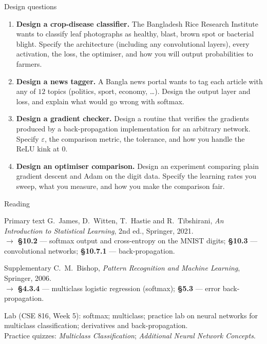 \documentclass[aspectratio=169,10pt]{beamer}
\begin{document}
\begin{frame}{Design questions}
  \footnotesize
  \begin{enumerate}
    \item \textbf{Design a crop-disease classifier.} The Bangladesh Rice Research Institute
          wants to classify leaf photographs as healthy, blast, brown spot or bacterial
          blight. Specify the architecture (including any convolutional layers), every
          activation, the loss, the optimiser, and how you will output probabilities to
          farmers. \hfill{}
    \item \textbf{Design a news tagger.} A Bangla news portal wants to tag each article with
          any of $12$ topics (politics, sport, economy, \dots). Design the output layer and
          loss, and explain what would go wrong with softmax. \hfill{}
    \item \textbf{Design a gradient checker.} Design a routine that verifies the gradients
          produced by a back-propagation implementation for an arbitrary network. Specify
          $\varepsilon$, the comparison metric, the tolerance, and how you handle the
          ReLU kink at $0$. \hfill{}
    \item \textbf{Design an optimiser comparison.} Design an experiment comparing plain
          gradient descent and Adam on the digit data. Specify the learning rates you
          sweep, what you measure, and how you make the comparison fair. \hfill{}
  \end{enumerate}
\end{frame}

\begin{frame}{Reading}
  \begin{block}{Primary text}
    G.~James, D.~Witten, T.~Hastie and R.~Tibshirani,
    \emph{An Introduction to Statistical Learning}, 2nd ed., Springer, 2021.\\[2pt]
    \hfill{\small$\rightarrow$ \textbf{\S10.2} --- softmax output and cross-entropy on the
    MNIST digits; \textbf{\S10.3} --- convolutional networks; \textbf{\S10.7.1} ---
    back-propagation.}
  \end{block}
  \begin{block}{Supplementary}
    C.~M.~Bishop, \emph{Pattern Recognition and Machine Learning}, Springer, 2006.\\[2pt]
    \hfill{\small$\rightarrow$ \textbf{\S4.3.4} --- multiclass logistic regression
    (softmax); \textbf{\S5.3} --- error back-propagation.}
  \end{block}
  \vspace{1mm}
  \begin{center}
    \small\color{cugray}
    Lab (CSE 816, Week 5): softmax; multiclass; practice lab on neural networks for
    multiclass classification; derivatives and back-propagation.\\
    Practice quizzes: \emph{Multiclass Classification}; \emph{Additional Neural Network
    Concepts}.
  \end{center}
\end{frame}
\end{document}
